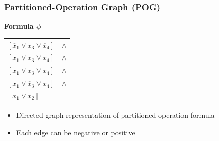 \documentclass[t,pdf]{beamer}
\newcommand{\opos}[1]{#1}
\newcommand{\oneg}[1]{\overline{#1}}
\begin{document}
\begin{frame}
  \frametitle{Partitioned-Operation Graph (POG)}

\medskip
\begin{minipage}{0.49\textwidth}
\begin{center}
  {\bf Formula $\phi$}\\[0.25em]
  \begin{tabular}{lc}
    $[\oneg{x}_1 \lor \opos{x}_3 \lor \oneg{x}_4]$ & $\land$ \\
    $[\oneg{x}_1 \lor \oneg{x}_3 \lor \opos{x}_4]$ & $\land$ \\
    $[\opos{x}_1 \lor \opos{x}_3 \lor \oneg{x}_4]$ & $\land$ \\
    $[\opos{x}_1 \lor \oneg{x}_3 \lor \opos{x}_4]$ & $\land$ \\
    $[\oneg{x}_1 \lor \oneg{x}_2]$ &  \\
  \end{tabular}
\end{center}
\end{minipage}
\begin{minipage}{0.49\textwidth}
  \centering{
  
  } %
\end{minipage}

\medskip

\begin{itemize}
\item Directed graph representation of partitioned-operation formula
\item Each edge can be negative or positive
\end{itemize}

\end{frame}
\end{document}
